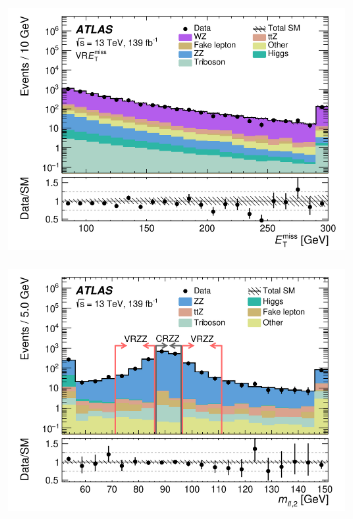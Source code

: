 \begin{figure}
\begin{subfigure}[b]{0.49\textwidth}
      \includegraphics[width=0.98\textwidth]{figs/rpvthreel/VRMet_met_logy.png}
      \caption{}
      \label{fig:Nminus1VRMet}
    \end{subfigure}
    \hfill
    \begin{subfigure}[b]{0.49\textwidth}
      \centering
      \includegraphics[width=0.98\textwidth]{figs/rpvthreel/CRZZ_Nm1_m_allLeptonicZs_1_logy.png}
      \caption{}
      \label{fig:mll2ZZ}
    \end{subfigure}
    \hfill
    \begin{subfigure}[b]{0.49\textwidth}
      \centering

\end{subfigure}
\end{figure}
